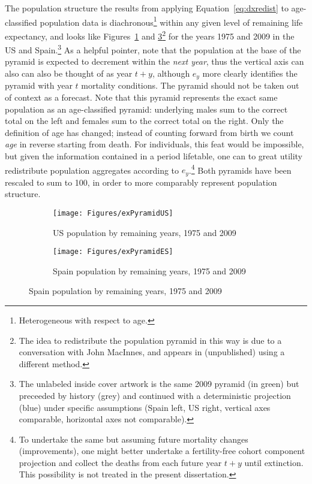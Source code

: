 \FloatBarrier
\label{sec:expopstruct1}
The population structure the results from applying Equation~\eqref{eq:dxredist}
to age-classified population data is diachronous\footnote{Heterogeneous with respect to age.} 
within any given level of remaining life expectancy, and 
looks like Figures~\ref{fig:exPyrUS} and \ref{fig:exPyrES}\footnote{The idea to
redistribute the population pyramid in this way is due to a conversation with 
John MacInnes, and appears in \citep{MacInnes2013pop} (unpublished) using a
different method.} for the years 1975 and 2009 in the US and
Spain.\footnote{The unlabeled inside cover artwork is the same 2009 pyramid (in
green) but preceeded by history (grey) and continued with a deterministic
projection (blue) under specific assumptions (Spain left, US right, vertical
axes comparable, horizontal axes not comparable).} As a helpful pointer, note that the
population at the base of the pyramid is expected to decrement within the \textit{next year}, thus the vertical axis can also can also be thought of as year $t+y$, although $e_y$ more clearly identifies the pyramid with year $t$ mortality conditions. The pyramid should not be taken out of context as a forecast. Note that this pyramid represents the exact same
population as an age-classified pyramid: underlying males sum to the correct total on 
the left and females sum to the correct total on the right. Only the definition of age has
changed; instead of counting forward from birth we count \textit{age} in reverse
starting from death. For individuals, this feat would be impossible, but given
 the information contained in a period lifetable, one can to great utility 
 redistribute population aggregates according to $e_y$.\footnote{To undertake
 the same but assuming future mortality changes (improvements), one might
 better undertake a fertility-free cohort component projection and collect the
 deaths from each future year $t+y$ until extinction. This possibility is not
 treated in the present dissertation.} Both pyramids have been rescaled
 to sum to 100, in order to more comparably represent population structure.
\begin{figure}
        \centering
        \begin{subfigure}
                \centering
                \caption{US population by remaining years, 1975 and 2009}
                \texttt{[image: Figures/exPyramidUS]}
                \label{fig:exPyrUS}
        \end{subfigure}
        \begin{subfigure}
                \centering
                \caption{Spain population by remaining years, 1975 and 2009}
                \texttt{[image: Figures/exPyramidES]} 
                \label{fig:exPyrES}
        \end{subfigure}
\end{figure}

